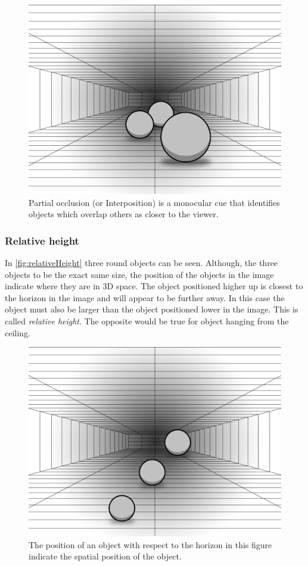 \begin{figure}[H]
	\centering
	\includegraphics[width=0.8\linewidth]{figure/Analysis/partialOcclusion.png}
	\caption{Partial occlusion (or Interposition) is a monocular cue that identifies objects which overlap others as closer to the viewer.}
	\label{fig:partialOcclusion}
\end{figure}

\subsubsection{Relative height}
In \autoref{fig:relativeHeight} three round objects can be seen. Although, the three objects to be the exact same size, the position of the objects in the image indicate where they are in 3D space. The object positioned higher up is closest to the horizon in the image and will appear to be further away. In this case the object must also be larger than the object positioned lower in the image. This is called \textit{relative height}. The opposite would be true for object hanging from the ceiling\citep{sensationPerception}.

\begin{figure}[H]
	\centering
	\includegraphics[width=0.8\linewidth]{figure/Analysis/relativeHeight.png}
	\caption{The position of an object with respect to the horizon in this figure indicate the spatial position of the object.}
	\label{fig:relativeHeight}
\end{figure}

